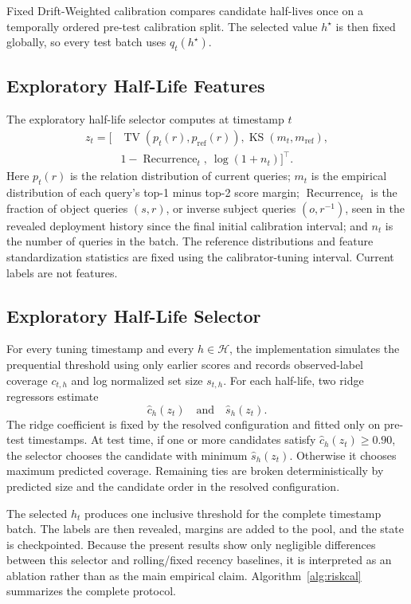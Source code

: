 \documentclass[information,article,submit,oneauthor,pdftex]{Definitions/mdpi}
\newcommand{\TV}{\operatorname{TV}}
\newcommand{\KS}{\operatorname{KS}}
\newcommand{\Rec}{\operatorname{Recurrence}}
\begin{document}
Fixed Drift-Weighted calibration compares candidate half-lives once on a
temporally ordered pre-test calibration split. The selected value \(h^\star\)
is then fixed globally, so every test batch uses \(q_t(h^\star)\).



\subsection{Exploratory Half-Life Features}

The exploratory half-life selector computes at timestamp \(t\)
\[
\begin{aligned}
  z_t=\big[&\TV(p_t(r),p_{\mathrm{ref}}(r)),
  \KS(m_t,m_{\mathrm{ref}}),\\
  &1-\Rec_t,\ \log(1+n_t)\big]^{\top}.
\end{aligned}
\]
Here \(p_t(r)\) is the relation distribution of current queries;
\(m_t\) is the empirical distribution of each query's top-1 minus top-2 score
margin; \(\Rec_t\) is the fraction of object queries \((s,r)\), or inverse
subject queries \((o,r^{-1})\), seen in the revealed deployment history since
the final initial calibration interval; and
\(n_t\) is the number of queries in the batch. The reference distributions and
feature standardization statistics are fixed using the calibrator-tuning
interval. Current labels are not features.

\subsection{Exploratory Half-Life Selector}

For every tuning timestamp and every \(h\in\mathcal{H}\), the implementation
simulates the prequential threshold using only earlier scores and records
observed-label coverage \(c_{t,h}\) and log normalized set size \(s_{t,h}\).
For each half-life, two ridge regressors estimate
\[
  \widehat{c}_h(z_t)
  \quad\text{and}\quad
  \widehat{s}_h(z_t).
\]
The ridge coefficient is fixed by the resolved configuration and fitted only on
pre-test timestamps. At test time, if one or more candidates satisfy
\(\widehat{c}_h(z_t)\geq 0.90\), the selector chooses the candidate with minimum
\(\widehat{s}_h(z_t)\). Otherwise it chooses maximum predicted coverage.
Remaining ties are broken deterministically by predicted size and the candidate
order in the resolved configuration.

The selected \(h_t\) produces one inclusive threshold for the complete
timestamp batch. The labels are then revealed, margins are added to the pool,
and the state is checkpointed. Because the present results show only negligible
differences between this selector and rolling/fixed recency baselines, it is
interpreted as an ablation rather than as the main empirical claim.
Algorithm~\ref{alg:riskcal} summarizes the complete protocol.
\end{document}
